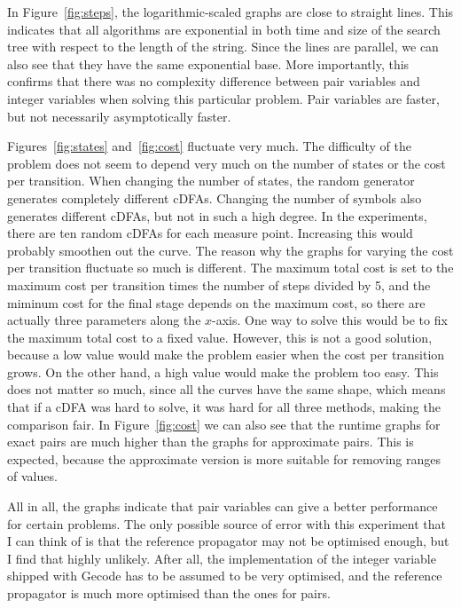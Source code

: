 \documentclass[a4paper,11pt]{article}
\begin{document}
In Figure~\ref{fig:steps}, the logarithmic-scaled graphs are close to straight lines. This indicates that all algorithms are exponential in both time and size of the search tree with respect to the length of the string. Since the lines are parallel, we can also see that they have the same exponential base. More importantly, this confirms that there was no complexity difference between pair variables and integer variables when solving this particular problem. Pair variables are faster, but not necessarily asymptotically faster. 

Figures~\ref{fig:states} and~\ref{fig:cost} fluctuate very much. The difficulty of the problem does not seem to depend very much on the number of states or the cost per transition. When changing the number of states, the random generator generates completely different cDFAs. Changing the number of symbols also generates different cDFAs, but not in such a high degree. In the experiments, there are ten random cDFAs for each measure point. Increasing this would probably smoothen out the curve. The reason why the graphs for varying the cost per transition fluctuate so much is different. The maximum total cost is set to the maximum cost per transition times the number of steps divided by 5, and the miminum cost for the final stage depends on the maximum cost, so there are actually three parameters along the $x$-axis. One way to solve this would be to fix the maximum total cost to a fixed value. However, this is not a good solution, because a low value would make the problem easier when the cost per transition grows. On the other hand, a high value would make the problem too easy. This does not matter so much, since all the curves have the same shape, which means that if a cDFA was hard to solve, it was hard for all three methods, making the comparison fair. In Figure~\ref{fig:cost} we can also see that the runtime graphs for exact pairs are much higher than the graphs for approximate pairs. This is expected, because the approximate version is more suitable for removing ranges of values.

All in all, the graphs indicate that pair variables can give a better performance for certain problems. The only possible source of error with this experiment that I can think of is that the reference propagator may not be optimised enough, but I find that highly unlikely. After all, the implementation of the integer variable shipped with Gecode has to be assumed to be very optimised, and the reference propagator is much more optimised than the ones for pairs.
\end{document}
